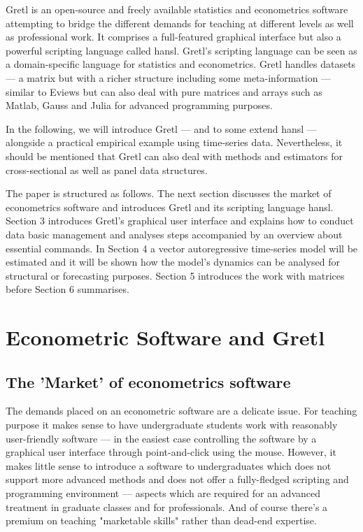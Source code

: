 \documentclass[11pt]{article}
\begin{document}
Gretl is an open-source and freely available statistics and econometrics software attempting to bridge the different demands for teaching at different levels as well as professional work. It comprises a full-featured graphical interface but also a powerful scripting language called hansl. Gretl's scripting language can be seen as a domain-specific language for statistics and econometrics. Gretl handles datasets --- a matrix but with a richer structure including some meta-information %
--- similar to Eviews but can also deal with pure matrices and arrays such as Matlab, Gauss and Julia for advanced programming purposes.

In the following, we will introduce Gretl --- and to some extend hansl --- alongside a practical empirical example using time-series data. Nevertheless, it should be mentioned that Gretl can also deal with methods and estimators for cross-sectional as well as panel data structures.

The paper is structured as follows. The next section discusses the market of econometrics software and introduces Gretl and its scripting language hansl. Section 3 introduces Gretl's graphical user interface and explains how to conduct data basic management and analyses steps accompanied by an overview about essential commands. In Section 4 a vector autoregressive time-series model will be estimated and it will be shown how the model's dynamics can be analysed for structural or forecasting purposes. Section 5 introduces the work with matrices before Section 6 summarises.


\section{Econometric Software and Gretl}

\subsection{The 'Market' of econometrics software}
The demands placed on an econometric software are a delicate issue. For teaching purpose it makes sense to have undergraduate students work with reasonably user-friendly software --- in the easiest case controlling the software by a graphical user interface through point-and-click using the mouse. However, it makes little sense to introduce a software to undergraduates which does not support more advanced methods and does not offer a fully-fledged scripting and programming environment --- aspects which are required for an advanced treatment in graduate classes and for professionals. And of course there's a premium on teaching "marketable skills" rather than dead-end expertise.
\end{document}
